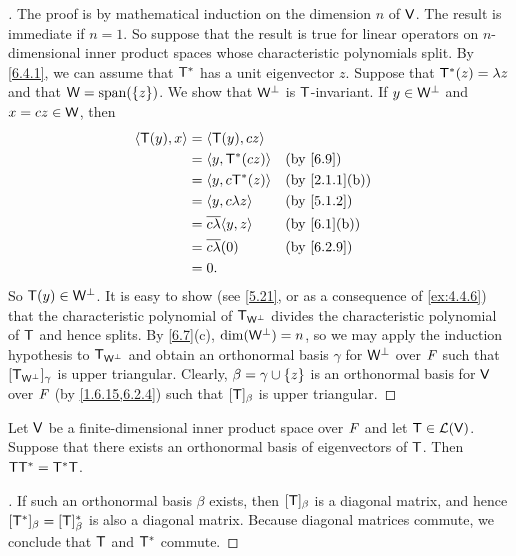 \begin{proof}[]
  The proof is by mathematical induction on the dimension \(n\) of \(\mathsf{V}\).
  The result is immediate if \(n = 1\).
  So suppose that the result is true for linear operators on \(n\)-dimensional inner product spaces whose characteristic polynomials split.
  By \cref{6.4.1}, we can assume that \(\mathsf{T}^*\) has a unit eigenvector \(z\).
  Suppose that \(\mathsf{T}^*(z) = \lambda z\) and that \(\W = \spn{\set{z}}\).
  We show that \(\mathsf{W}^{\perp}\) is \(\mathsf{T}\)-invariant.
  If \(y \in \mathsf{W}^{\perp}\) and \(x = cz \in \mathsf{W}\), then
  \begin{align*}
    \inn{\T(y), x} & = \inn{\T(y), cz}                                \\
                   & = \inn{y, \T^*(cz)}           &  & \by{6.9}      \\
                   & = \inn{y, c \T^*(z)}          &  & \by{2.1.1}[b] \\
                   & = \inn{y, c \lambda z}        &  & \by{5.1.2}    \\
                   & = \conj{c \lambda} \inn{y, z} &  & \by{6.1}[b]   \\
                   & = \conj{c \lambda} (0)        &  & \by{6.2.9}    \\
                   & = 0.
  \end{align*}
  So \(\mathsf{T}(y) \in \mathsf{W}^{\perp}\).
  It is easy to show (see \cref{5.21}, or as a consequence of \cref{ex:4.4.6}) that the characteristic polynomial of \(\mathsf{T}_{\mathsf{W}^{\perp}}\) divides the characteristic polynomial of \(\mathsf{T}\) and hence splits.
  By \cref{6.7}(c), \(\dim(\mathsf{W}^{\perp}) = n\), so we may apply the induction hypothesis to \(\mathsf{T}_{\mathsf{W}^{\perp}}\) and obtain an orthonormal basis \(\gamma\) for \(\mathsf{W}^{\perp}\) over \(\mathit{F}\) such that \([\mathsf{T}_{\mathsf{W}^{\perp}}]_{\gamma}\) is upper triangular.
  Clearly, \(\beta = \gamma \cup \left\lbrace z\right\rbrace\) is an orthonormal basis for \(\mathsf{V}\) over \(\mathit{F}\) (by \cref{1.6.15,6.2.4}) such that \([\mathsf{T}]_{\beta}\) is upper triangular.
\end{proof}

\begin{cor}\label{6.4.2}
  Let \(\mathsf{V}\) be a finite-dimensional inner product space over \(\mathit{F}\) and let \(\mathsf{T} \in \mathcal{L}(\mathsf{V})\).
  Suppose that there exists an orthonormal basis of eigenvectors of \(\mathsf{T}\).
  Then \(\mathsf{T} \mathsf{T}^* = \mathsf{T}^* \mathsf{T}\).
\end{cor}

\begin{proof}[]
  If such an orthonormal basis \(\beta\) exists, then \([\mathsf{T}]_{\beta}\) is a diagonal matrix, and hence \([\mathsf{T}^*]_{\beta} = [\mathsf{T}]_{\beta}^*\) is also a diagonal matrix.
  Because diagonal matrices commute, we conclude that \(\mathsf{T}\) and \(\mathsf{T}^*\) commute.
\end{proof}


